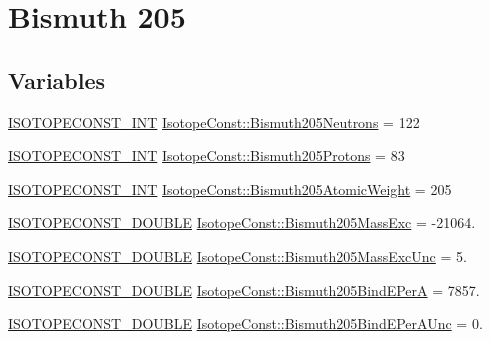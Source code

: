 \hypertarget{group___isotope_const-_bismuth-_bi205}{}\section{Bismuth 205}
\label{group___isotope_const-_bismuth-_bi205}
\subsection*{Variables}
\begin{DoxyCompactItemize}
\item 
\mbox{\hyperlink{group___isotope_const-_macros_ga5f18360b3e99483a35c32d789e62621c}{I\+S\+O\+T\+O\+P\+E\+C\+O\+N\+S\+T\+\_\+\+I\+NT}} \mbox{\hyperlink{group___isotope_const-_bismuth-_bi205_gac03afb08090b24fc0d294fb1f601bd8d}{Isotope\+Const\+::\+Bismuth205\+Neutrons}} = 122
\item 
\mbox{\hyperlink{group___isotope_const-_macros_ga5f18360b3e99483a35c32d789e62621c}{I\+S\+O\+T\+O\+P\+E\+C\+O\+N\+S\+T\+\_\+\+I\+NT}} \mbox{\hyperlink{group___isotope_const-_bismuth-_bi205_ga361404f9fd95f0639941bbacbfd2523f}{Isotope\+Const\+::\+Bismuth205\+Protons}} = 83
\item 
\mbox{\hyperlink{group___isotope_const-_macros_ga5f18360b3e99483a35c32d789e62621c}{I\+S\+O\+T\+O\+P\+E\+C\+O\+N\+S\+T\+\_\+\+I\+NT}} \mbox{\hyperlink{group___isotope_const-_bismuth-_bi205_ga17a820421cdd5d4edfab94bdffae6700}{Isotope\+Const\+::\+Bismuth205\+Atomic\+Weight}} = 205
\item 
\mbox{\hyperlink{group___isotope_const-_macros_ga8f45a7272ce02c0b4c65c44636ed719a}{I\+S\+O\+T\+O\+P\+E\+C\+O\+N\+S\+T\+\_\+\+D\+O\+U\+B\+LE}} \mbox{\hyperlink{group___isotope_const-_bismuth-_bi205_gae4e03fe5ef1e60b0f11299b6c7bd53bb}{Isotope\+Const\+::\+Bismuth205\+Mass\+Exc}} = -\/21064.
\item 
\mbox{\hyperlink{group___isotope_const-_macros_ga8f45a7272ce02c0b4c65c44636ed719a}{I\+S\+O\+T\+O\+P\+E\+C\+O\+N\+S\+T\+\_\+\+D\+O\+U\+B\+LE}} \mbox{\hyperlink{group___isotope_const-_bismuth-_bi205_ga773093b465532451c3067da62d665611}{Isotope\+Const\+::\+Bismuth205\+Mass\+Exc\+Unc}} = 5.
\item 
\mbox{\hyperlink{group___isotope_const-_macros_ga8f45a7272ce02c0b4c65c44636ed719a}{I\+S\+O\+T\+O\+P\+E\+C\+O\+N\+S\+T\+\_\+\+D\+O\+U\+B\+LE}} \mbox{\hyperlink{group___isotope_const-_bismuth-_bi205_ga1244dd72fdb55c3553354cea049bd8d4}{Isotope\+Const\+::\+Bismuth205\+Bind\+E\+PerA}} = 7857.
\item 
\mbox{\hyperlink{group___isotope_const-_macros_ga8f45a7272ce02c0b4c65c44636ed719a}{I\+S\+O\+T\+O\+P\+E\+C\+O\+N\+S\+T\+\_\+\+D\+O\+U\+B\+LE}} \mbox{\hyperlink{group___isotope_const-_bismuth-_bi205_ga1bd710420520f45518ffc54f5a58cb81}{Isotope\+Const\+::\+Bismuth205\+Bind\+E\+Per\+A\+Unc}} = 0.

\end{DoxyCompactItemize}
